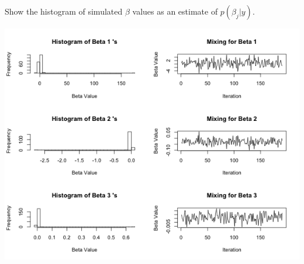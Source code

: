 \documentclass[12pt,letterpaper]{article}
\begin{document}
Show the histogram of simulated $\beta$ values as an estimate of $p(\beta_j|y)$.

\includegraphics[width=150mm,scale=1.5]{hw32pic.png}
\end{document}
